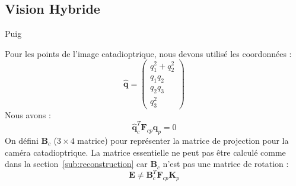 \subsection{Vision Hybride}
Puig \cite{Puig08}

Pour les points de l'image catadioptrique, nous devons utilisé les coordonnées \cite{lifted}:
$$\hat{\mathbf{q}}=\begin{pmatrix}q_1^2+q_2^2\\q_1q_2\\q_2q_3\\q_3^2\end{pmatrix}$$
Nous avons :
\begin{equation}
\hat{\mathbf{q}}_c^T\mathbf{F}_{cp}\mathbf{q}_p=0
\end{equation}
On défini $\mathbf{B}_c$ ($3\times4$ matrice) pour représenter la matrice de projection pour la caméra catadioptrique.
La matrice essentielle ne peut pas \^etre calculé comme dans la section~\ref{sub:reconstruction} car $\mathbf{B}_c$ n'est pas une matrice de rotation :
\begin{equation}
\mathbf{E} \neq \mathbf{B}_c^T \mathbf{F}_{cp} \mathbf{K}_p
\end{equation}
